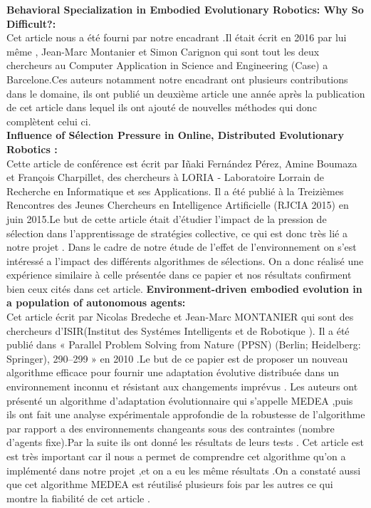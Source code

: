 \documentclass[11pt]{article}
\begin{document}
\textbf{Behavioral Specialization in Embodied Evolutionary Robotics: Why So Difficult?:}\\
Cet article nous a été fourni par notre encadrant .Il était écrit  en 2016 par lui même , Jean-Marc Montanier et Simon Carignon qui sont tout les deux chercheurs au Computer Application in Science and Engineering (Case) a Barcelone.Ces auteurs notamment notre encadrant ont plusieurs contributions dans le domaine, ils ont publié un deuxième article une année après  la publication de cet article  dans lequel ils ont ajouté de nouvelles méthodes qui donc complètent  celui ci.\\
\textbf{Influence of Sélection Pressure in Online, Distributed Evolutionary Robotics :}\\
Cette article de conférence est écrit par Iñaki Fernández Pérez, Amine Boumaza et François Charpillet, des chercheurs à LORIA - Laboratoire Lorrain de Recherche en Informatique et ses Applications. Il a été publié à la Treizièmes Rencontres des Jeunes Chercheurs en Intelligence Artificielle (RJCIA 2015) en juin 2015.Le but de cette article était d’étudier l’impact de la pression de sélection dans l’apprentissage de stratégies collective, ce qui est donc très lié a notre projet . Dans le cadre de notre étude de l’effet de l’environnement on s’est intéressé a l’impact des différents algorithmes de sélections. On a donc réalisé une expérience similaire à celle présentée dans ce papier et nos résultats confirment bien ceux cités dans cet article. 
\textbf{Environment-driven embodied evolution in a population of autonomous agents:}\\
Cet article  écrit par Nicolas Bredeche et Jean-Marc MONTANIER qui sont des chercheurs d’ISIR(Institut des Systémes Intelligents et de Robotique ). Il a été publié  dans « Parallel Problem  Solving from Nature (PPSN) (Berlin; Heidelberg: Springer), 290–299 » en 2010 .Le but de ce papier est de proposer un nouveau algorithme efficace pour fournir une adaptation évolutive distribuée dans un environnement inconnu et résistant aux changements imprévus .
Les auteurs ont  présenté un algorithme d’adaptation  évolutionnaire qui s’appelle  MEDEA ,puis ils ont fait une analyse expérimentale approfondie de la robustesse de l’algorithme par rapport a des environnements  changeants sous des contraintes (nombre d’agents fixe).Par la suite ils ont donné  les résultats de leurs tests  .
Cet article est est très important car il nous a permet de comprendre cet algorithme qu'on a implémenté dans notre projet ,et on a eu les même résultats .On a constaté aussi que cet algorithme MEDEA est réutilisé plusieurs fois par les autres ce qui montre  la fiabilité de cet article .
\end{document}
